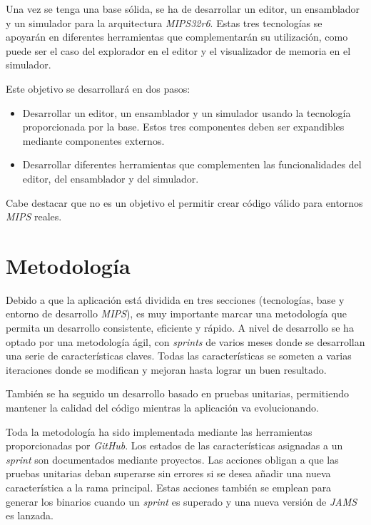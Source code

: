 Una vez se tenga una base sólida, se ha de desarrollar un editor, un ensamblador
y un simulador para la arquitectura \textit{MIPS32r6}.
Estas tres tecnologías se apoyarán en diferentes herramientas que complementarán
su utilización, como puede ser el caso del explorador en el editor y el visualizador
de memoria en el simulador.

Este objetivo se desarrollará en dos pasos:

\begin{itemize}
    \item Desarrollar un editor, un ensamblador y un simulador usando la tecnología
    proporcionada por la base.
    Estos tres componentes deben ser expandibles mediante componentes externos.
    \item Desarrollar diferentes herramientas que complementen las funcionalidades
    del editor, del ensamblador y del simulador.
\end{itemize}

Cabe destacar que no es un objetivo el permitir crear código válido para
entornos \textit{MIPS} reales.

\section{Metodología}\label{sec:metodologia}

Debido a que la aplicación está dividida en tres secciones (tecnologías, base y entorno de desarrollo \textit{MIPS}),
es muy importante marcar una metodología que permita un desarrollo consistente, eficiente y rápido.
A nivel de desarrollo se ha optado por una metodología ágil, con \textit{sprints} de varios meses
donde se desarrollan una serie de características claves.
Todas las características se someten a varias iteraciones donde se modifican y mejoran hasta lograr un
buen resultado.

También se ha seguido un desarrollo basado en pruebas unitarias,
permitiendo mantener la calidad del código mientras la aplicación va evolucionando.

Toda la metodología ha sido implementada mediante las herramientas proporcionadas por \textit{GitHub}.
Los estados de las características asignadas a un \textit{sprint} son documentados mediante proyectos.
Las acciones obligan a que las pruebas unitarias deban superarse sin errores si se desea añadir una nueva
característica a la rama principal.
Estas acciones también se emplean para generar los binarios cuando un \textit{sprint} es superado y una
nueva versión de \textit{JAMS} es lanzada.


